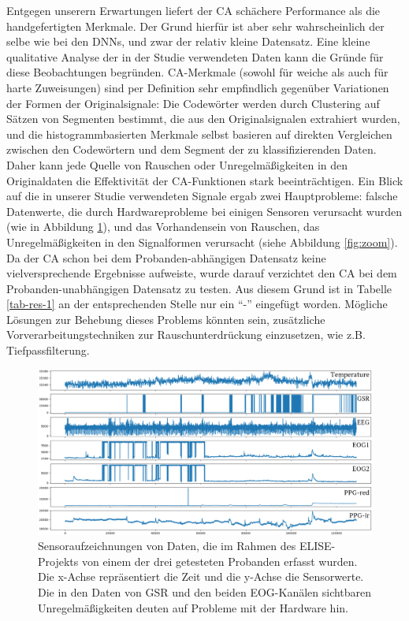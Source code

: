 Entgegen unserern Erwartungen liefert der CA sch{\"a}chere Performance als die handgefertigten Merkmale. 
Der Grund hierf{\"u}r ist aber sehr wahrscheinlich der selbe wie bei den  DNNs, und zwar der relativ kleine Datensatz. 
Eine kleine qualitative Analyse der in der Studie verwendeten Daten kann die Gr{\"u}nde f{\"u}r diese Beobachtungen begr{\"u}nden. 
CA-Merkmale (sowohl f{\"u}r weiche als auch f{\"u}r harte Zuweisungen) sind per Definition sehr empfindlich gegen{\"u}ber Variationen der Formen der Originalsignale: Die Codew{\"o}rter werden durch Clustering auf S{\"a}tzen von Segmenten bestimmt, die aus den Originalsignalen extrahiert wurden, und die histogrammbasierten Merkmale selbst basieren auf direkten Vergleichen zwischen den Codew{\"o}rtern und dem Segment der zu klassifizierenden Daten. 
Daher kann jede Quelle von Rauschen oder Unregelm{\"a}{\ss}igkeiten in den Originaldaten die Effektivit{\"a}t der CA-Funktionen stark beeintr{\"a}chtigen. 
Ein Blick auf die in unserer Studie verwendeten Signale ergab zwei Hauptprobleme: falsche Datenwerte, die durch Hardwareprobleme bei einigen Sensoren verursacht wurden (wie in Abbildung \ref{fig:bad_signals}), und das Vorhandensein von Rauschen, das Unregelm{\"a}{\ss}igkeiten in den Signalformen verursacht (siehe Abbildung \ref{fig:zoom}). 
Da der CA schon bei dem Probanden-abhängigen Datensatz keine vielversprechende Ergebnisse aufweiste, wurde darauf verzichtet den CA bei dem Probanden-unabhängigen Datensatz zu testen.
Aus diesem Grund ist in Tabelle \ref{tab-res-1} an der entsprechenden Stelle nur ein ``-'' eingefügt worden.
M{\"o}gliche L{\"o}sungen zur Behebung dieses Problems k{\"o}nnten sein, zus{\"a}tzliche Vorverarbeitungstechniken zur Rauschunterdr{\"u}ckung einzusetzen, wie z.B. Tiefpassfilterung. \\


\begin{figure}[H]
\includegraphics[width=\textwidth]{Images/bad_signals.png} 
\vspace{-0.3cm} \caption[Sensoraufzeichnungen von Daten]{ Sensoraufzeichnungen von Daten, die im Rahmen des ELISE-Projekts von einem der drei getesteten Probanden erfasst wurden. Die x-Achse repr{\"a}sentiert die Zeit und die y-Achse die Sensorwerte. Die in den Daten von GSR und den beiden EOG-Kan{\"a}len sichtbaren Unregelm{\"a}{\ss}igkeiten deuten auf Probleme mit der Hardware hin. }
\label{fig:bad_signals} \end{figure} \vspace{0.5cm}


